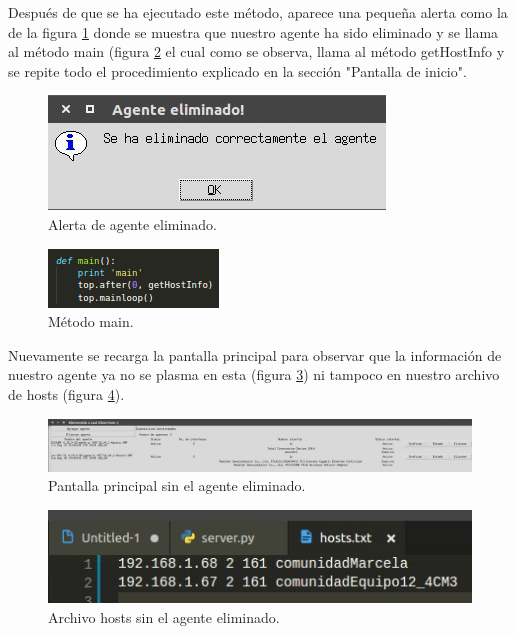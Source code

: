 Después de que se ha ejecutado este método, aparece una pequeña alerta como la de la figura \ref{image:alertaE} donde se muestra que nuestro agente ha sido eliminado y se llama al método main (figura \ref{image:main} el cual como se observa, llama al método getHostInfo y se repite todo el procedimiento explicado en la sección "Pantalla de inicio".

\FloatBarrier
\begin{figure}[htbp!]
		\centering
	\includegraphics[width=.4 \textwidth]{images/alertaE}
		\caption{Alerta de agente eliminado.}		\label{image:alertaE}
\end{figure}
\FloatBarrier

\FloatBarrier
\begin{figure}[htbp!]
		\centering
	\includegraphics[width=.4 \textwidth]{images/main}
		\caption{Método main.}		\label{image:main}
\end{figure}
\FloatBarrier

Nuevamente se recarga la pantalla principal para observar que la información de nuestro agente ya no se plasma en esta (figura \ref{image:principalSA}) ni tampoco en nuestro archivo de hosts (figura \ref{image:hostsSA}).

\FloatBarrier
\begin{figure}[htbp!]
		\centering
	\includegraphics[width=1.1 \textwidth]{images/principalSA}
		\caption{Pantalla principal sin el agente eliminado.}		\label{image:principalSA}
\end{figure}
\FloatBarrier

\FloatBarrier
\begin{figure}[htbp!]
		\centering
	\includegraphics[width=.6 \textwidth]{images/hostsSA}
		\caption{Archivo hosts sin el agente eliminado.}		\label{image:hostsSA}
\end{figure}
\FloatBarrier